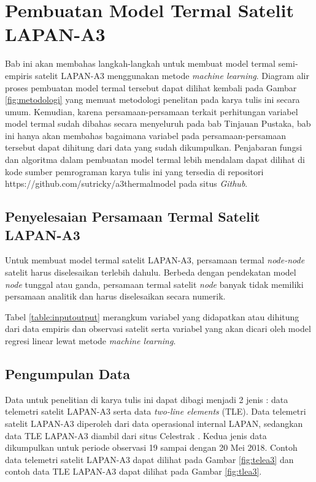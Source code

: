 \chapter{Pembuatan Model Termal Satelit LAPAN-A3}

Bab ini akan membahas langkah-langkah untuk membuat model termal semi-empiris
satelit LAPAN-A3 menggunakan metode \textit{machine learning}. Diagram alir
proses pembuatan model termal tersebut dapat dilihat kembali pada Gambar
\ref{fig:metodologi} yang memuat metodologi penelitan pada karya tulis ini
secara umum. Kemudian, karena persamaan-persamaan terkait perhitungan variabel
model termal sudah dibahas secara menyeluruh pada bab Tinjauan Pustaka, bab ini
hanya akan membahas bagaimana variabel pada persamaan-persamaan tersebut dapat
dihitung dari data yang sudah dikumpulkan. Penjabaran fungsi dan algoritma
dalam pembuatan model termal lebih mendalam dapat dilihat di kode sumber
pemrograman karya tulis ini yang tersedia di repositori
https://github.com/sutricky/a3thermalmodel pada situs \textit{Github}.

\section{Penyelesaian Persamaan Termal Satelit LAPAN-A3}

Untuk membuat model termal satelit LAPAN-A3, persamaan termal
\textit{node-node} satelit harus diselesaikan terlebih dahulu. Berbeda dengan
pendekatan model \textit{node} tunggal atau ganda, persamaan termal satelit
\textit{node} banyak tidak memiliki persamaan analitik dan harus diselesaikan
secara numerik.

Tabel \ref{table:inputoutput} merangkum variabel yang didapatkan atau dihitung
dari data empiris dan observasi satelit serta variabel yang akan dicari oleh
model regresi linear lewat metode \textit{machine learning}.

\section{Pengumpulan Data}

Data untuk penelitian di karya tulis ini dapat dibagi menjadi 2 jenis : data
telemetri satelit LAPAN-A3 serta data \textit{two-line elements} (TLE). Data
telemetri satelit LAPAN-A3 diperoleh dari data operasional internal LAPAN,
sedangkan data TLE LAPAN-A3 diambil dari situs Celestrak \cite{kelso}. Kedua
jenis data dikumpulkan untuk periode observasi 19 sampai dengan 20 Mei 2018.
Contoh data telemetri satelit LAPAN-A3 dapat dilihat pada Gambar
\ref{fig:telea3} dan contoh data TLE LAPAN-A3 dapat dilihat pada Gambar
\ref{fig:tlea3}.

